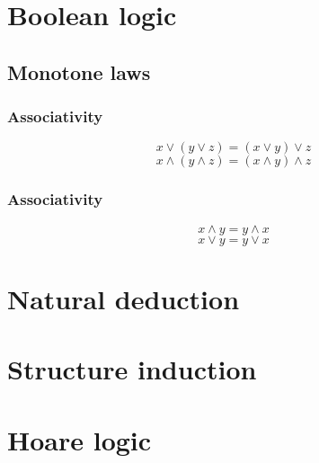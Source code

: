 \documentclass[10pt,landscape]{article}
\begin{document}
\begin{multicols*}{3}
\section{Boolean logic}
\subsection{Monotone laws}
\subsubsection*{Associativity}
\[
x \lor (y \lor z) = (x \lor y) \lor z
\]
\[
x \land (y \land z) = (x \land y) \land z
\]
\subsubsection*{Associativity}
\[
x \land y = y \land x
\]
\[
x \lor y = y \lor x
\]

\section{Natural deduction}

\section{Structure induction}

\section{Hoare logic}

\end{multicols*}
\end{document}
